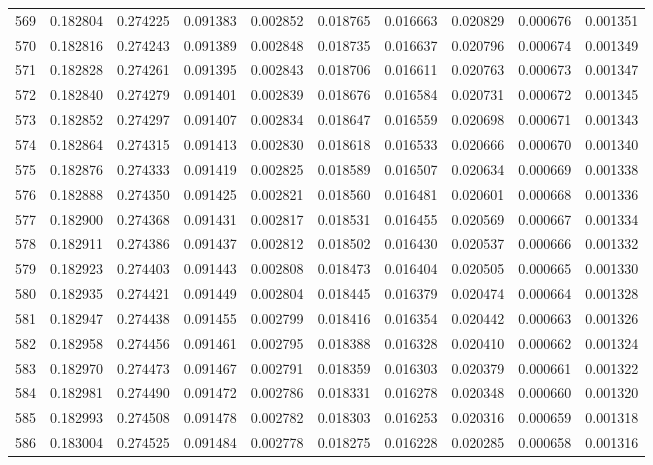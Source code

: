 \begin{tabular}{lrrrrrrrrr}
569 & 0.182804 & 0.274225 & 0.091383 & 0.002852 & 0.018765 & 0.016663 & 0.020829 & 0.000676 & 0.001351 \\
570 & 0.182816 & 0.274243 & 0.091389 & 0.002848 & 0.018735 & 0.016637 & 0.020796 & 0.000674 & 0.001349 \\
571 & 0.182828 & 0.274261 & 0.091395 & 0.002843 & 0.018706 & 0.016611 & 0.020763 & 0.000673 & 0.001347 \\
572 & 0.182840 & 0.274279 & 0.091401 & 0.002839 & 0.018676 & 0.016584 & 0.020731 & 0.000672 & 0.001345 \\
573 & 0.182852 & 0.274297 & 0.091407 & 0.002834 & 0.018647 & 0.016559 & 0.020698 & 0.000671 & 0.001343 \\
574 & 0.182864 & 0.274315 & 0.091413 & 0.002830 & 0.018618 & 0.016533 & 0.020666 & 0.000670 & 0.001340 \\
575 & 0.182876 & 0.274333 & 0.091419 & 0.002825 & 0.018589 & 0.016507 & 0.020634 & 0.000669 & 0.001338 \\
576 & 0.182888 & 0.274350 & 0.091425 & 0.002821 & 0.018560 & 0.016481 & 0.020601 & 0.000668 & 0.001336 \\
577 & 0.182900 & 0.274368 & 0.091431 & 0.002817 & 0.018531 & 0.016455 & 0.020569 & 0.000667 & 0.001334 \\
578 & 0.182911 & 0.274386 & 0.091437 & 0.002812 & 0.018502 & 0.016430 & 0.020537 & 0.000666 & 0.001332 \\
579 & 0.182923 & 0.274403 & 0.091443 & 0.002808 & 0.018473 & 0.016404 & 0.020505 & 0.000665 & 0.001330 \\
580 & 0.182935 & 0.274421 & 0.091449 & 0.002804 & 0.018445 & 0.016379 & 0.020474 & 0.000664 & 0.001328 \\
581 & 0.182947 & 0.274438 & 0.091455 & 0.002799 & 0.018416 & 0.016354 & 0.020442 & 0.000663 & 0.001326 \\
582 & 0.182958 & 0.274456 & 0.091461 & 0.002795 & 0.018388 & 0.016328 & 0.020410 & 0.000662 & 0.001324 \\
583 & 0.182970 & 0.274473 & 0.091467 & 0.002791 & 0.018359 & 0.016303 & 0.020379 & 0.000661 & 0.001322 \\
584 & 0.182981 & 0.274490 & 0.091472 & 0.002786 & 0.018331 & 0.016278 & 0.020348 & 0.000660 & 0.001320 \\
585 & 0.182993 & 0.274508 & 0.091478 & 0.002782 & 0.018303 & 0.016253 & 0.020316 & 0.000659 & 0.001318 \\
586 & 0.183004 & 0.274525 & 0.091484 & 0.002778 & 0.018275 & 0.016228 & 0.020285 & 0.000658 & 0.001316 \\

\end{tabular}
